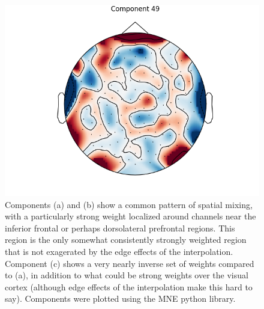 \documentclass[fleqn,10pt]{wlscirep}
\begin{document}
\begin{figure}[h!]
\begin{minipage}{0.31\textwidth}
    \includegraphics[width=\linewidth]{max_act/49.png}
    \subcaption{}
  \end{minipage}
  \caption[textfind]{Components (a) and (b) show a common pattern of spatial mixing, with a particularly strong weight localized around channels near the inferior frontal or perhaps dorsolateral prefrontal regions. This region is the only somewhat consistently strongly weighted region that is not exagerated by the edge effects of the interpolation. Component (c) shows a very nearly inverse set of weights compared to (a), in addition to what could be strong weights over the visual cortex (although edge effects of the interpolation make this hard to say). Components were plotted using the MNE python library. \footnotemark} \label{fig:max_components}
\end{figure}
\end{document}
